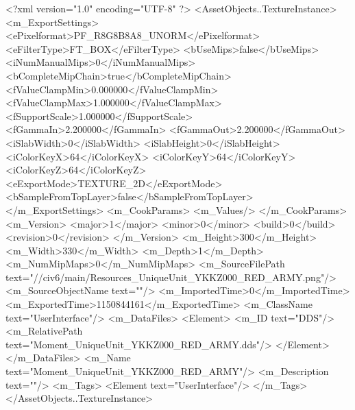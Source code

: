 <?xml version="1.0" encoding="UTF-8" ?>
<AssetObjects..TextureInstance>
	<m_ExportSettings>
		<ePixelformat>PF_R8G8B8A8_UNORM</ePixelformat>
		<eFilterType>FT_BOX</eFilterType>
		<bUseMips>false</bUseMips>
		<iNumManualMips>0</iNumManualMips>
		<bCompleteMipChain>true</bCompleteMipChain>
		<fValueClampMin>0.000000</fValueClampMin>
		<fValueClampMax>1.000000</fValueClampMax>
		<fSupportScale>1.000000</fSupportScale>
		<fGammaIn>2.200000</fGammaIn>
		<fGammaOut>2.200000</fGammaOut>
		<iSlabWidth>0</iSlabWidth>
		<iSlabHeight>0</iSlabHeight>
		<iColorKeyX>64</iColorKeyX>
		<iColorKeyY>64</iColorKeyY>
		<iColorKeyZ>64</iColorKeyZ>
		<eExportMode>TEXTURE_2D</eExportMode>
		<bSampleFromTopLayer>false</bSampleFromTopLayer>
	</m_ExportSettings>
	<m_CookParams>
		<m_Values/>
	</m_CookParams>
	<m_Version>
		<major>1</major>
		<minor>0</minor>
		<build>0</build>
		<revision>0</revision>
	</m_Version>
	<m_Height>300</m_Height>
	<m_Width>330</m_Width>
	<m_Depth>1</m_Depth>
	<m_NumMipMaps>0</m_NumMipMaps>
	<m_SourceFilePath text="//civ6/main/Resources\Moment_UniqueUnit_YKKZ000_RED_ARMY.png"/>
	<m_SourceObjectName text=""/>
	<m_ImportedTime>0</m_ImportedTime>
	<m_ExportedTime>1150844161</m_ExportedTime>
	<m_ClassName text="UserInterface"/>
	<m_DataFiles>
		<Element>
			<m_ID text="DDS"/>
			<m_RelativePath text="Moment_UniqueUnit_YKKZ000_RED_ARMY.dds"/>
		</Element>
	</m_DataFiles>
	<m_Name text="Moment_UniqueUnit_YKKZ000_RED_ARMY"/>
	<m_Description text=""/>
	<m_Tags>
		<Element text="UserInterface"/>
	</m_Tags>
</AssetObjects..TextureInstance>

